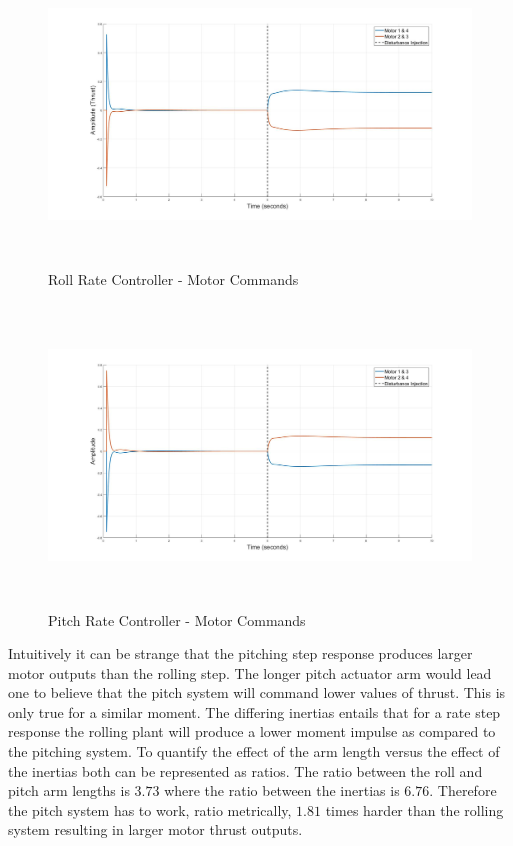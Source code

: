 \documentclass[12pt]{report}
\begin{document}
\begin{figure}[H]
	\centering
	\includegraphics[height = 8cm]{../Design/Matlab/Controllers/roll_rate_impulse.jpg}
	\caption{Roll Rate Controller -  Motor Commands}
	\label{IM_RollRateImpulse}
\end{figure}

\begin{figure}[H]
	\centering
	\includegraphics[height = 8cm]{../Design/Matlab/Controllers/pitch_rate_impulse.jpg}
	\caption{Pitch Rate Controller -  Motor Commands}
	\label{IM_PitchRateImpulse}
\end{figure}

Intuitively it can be strange that the pitching step response produces larger motor outputs than the rolling step. The longer pitch actuator arm would lead one to believe that the pitch system will command lower values of thrust. This is only true for a similar moment. The differing inertias entails that for a rate step response the rolling plant will produce a lower moment impulse as compared to the pitching system. To quantify the effect of the arm length versus the effect of the inertias both can be represented as ratios. The ratio between the roll and pitch arm lengths is $3.73$ where the ratio between the inertias is $6.76$. Therefore the pitch system has to work, ratio metrically, $1.81$ times harder than the rolling system resulting in larger motor thrust outputs.
\end{document}

